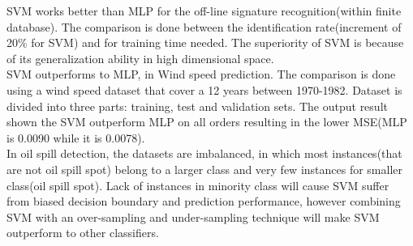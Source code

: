 SVM works better than MLP for the off-line signature recognition(within finite database). The comparison is done between the identification rate(increment of 20\% for SVM) and for training time needed. The superiority of SVM is because of its generalization ability in high dimensional space\cite{FriasMartinez2006693}.\\
SVM outperforms to MLP, in Wind speed prediction. The comparison is done using a wind speed dataset that cover a 12 years between 1970-1982. Dataset is divided into three parts: training, test and validation sets. The output result shown the SVM outperform MLP on all orders resulting in the lower MSE(MLP is 0.0090 while it is 0.0078)\cite{Mohandes2004939}.\\
In oil spill detection, the datasets are imbalanced, in which most instances(that are not oil spill spot) belong to a larger class and very few instances for smaller class(oil spill spot). Lack of instances in minority class will cause SVM suffer from biased decision boundary and prediction performance, however combining SVM with an over-sampling and under-sampling technique will make SVM outperform to other classifiers\cite{liu2006boosting}.

	
      




	